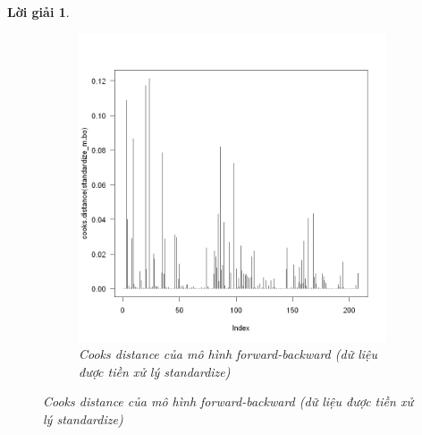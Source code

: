 \documentclass[14pt, a4paper]{article}
\theoremstyle{sltheorem}
\theoremstyle{soltheorem}
\newtheorem*{loigiai}{Lời giải}
\begin{document}
\begin{loigiai}
\begin{figure}[h!]
\begin{subfigure}[b]{0.4\textwidth}
            \includegraphics[width=\textwidth]{figures/standardize_mbo_cooks.png}
            \caption{Cooks distance của mô hình forward-backward (dữ liệu được tiền xử lý standardize)}
        \end{subfigure}
        \label{fig:Cooks-distance-mbo}
    \end{figure}


\end{loigiai}
\end{document}
